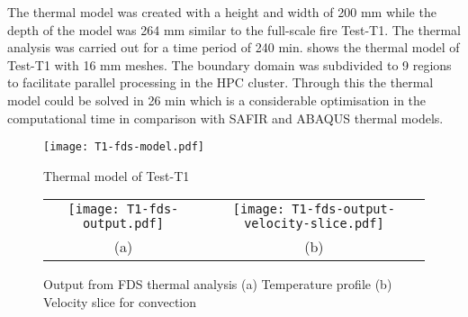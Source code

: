 The thermal model was created with a height and width of 200 mm while the depth of the model was 264 mm similar to the full-scale fire Test-T1. The thermal analysis was carried out for a time period of 240 min.  shows the thermal model of Test-T1 with 16 mm meshes. The boundary domain was  subdivided to 9 regions to facilitate parallel processing in the HPC cluster. Through this the thermal model could be solved in 26 min which is a considerable optimisation in the computational time in comparison with SAFIR and ABAQUS thermal models.   
\begin{figure}[!htbp]
	\centering
		\texttt{[image: T1-fds-model.pdf]}
		\caption{Thermal model of Test-T1}
		\label{fig:T1-fds-model}
\end{figure}
\begin{figure}[!htbp]
	\centering
		\begin{tabular}{cc}
			\texttt{[image: T1-fds-output.pdf]} & \texttt{[image: T1-fds-output-velocity-slice.pdf]} \\
			(a) & (b) \\
		\end{tabular} 
		\caption{Output from FDS thermal analysis (a) Temperature profile (b) Velocity slice for convection}
		\label{fig:fds-output-profile-t1}
\end{figure}
